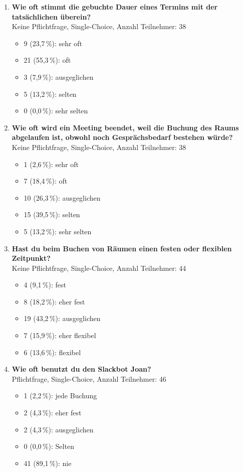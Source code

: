 \begin{enumerate}
    \item \textbf{Wie oft stimmt die gebuchte Dauer eines Termins mit der tatsächlichen überein?} 
    \\ 
    Keine Pflichtfrage, Single-Choice, Anzahl Teilnehmer: 38
    \begin{itemize}
        \item[] 9 (23,7\,\%): sehr oft
        \item[] 21 (55,3\,\%): oft
        \item[] 3 (7,9\,\%): ausgeglichen
        \item[] 5 (13,2\,\%): selten
        \item[] 0 (0,0\,\%): sehr selten
    \end{itemize}
    
    \item \textbf{Wie oft wird ein Meeting beendet, weil die Buchung des Raums abgelaufen ist, obwohl noch Gesprächsbedarf bestehen würde?} \\ 
    Keine Pflichtfrage, Single-Choice, Anzahl Teilnehmer: 38
    \begin{itemize}
        \item[] 1 (2,6\,\%): sehr oft
        \item[] 7 (18,4\,\%): oft
        \item[] 10 (26,3\,\%): ausgeglichen
        \item[] 15 (39,5\,\%): selten
        \item[] 5 (13,2\,\%): sehr selten
    \end{itemize}
    
    \item \textbf{Hast du beim Buchen von Räumen einen festen oder flexiblen Zeitpunkt?} \\ 
    Keine Pflichtfrage, Single-Choice, Anzahl Teilnehmer: 44
    \begin{itemize}
        \item[] 4 (9,1\,\%): fest
        \item[] 8 (18,2\,\%): eher fest
        \item[] 19 (43,2\,\%): ausgeglichen
        \item[] 7 (15,9\,\%): eher flexibel
        \item[] 6 (13,6\,\%): flexibel
    \end{itemize}
    
    \item \textbf{Wie oft benutzt du den Slackbot Joan?} \\ 
    Pflichtfrage, Single-Choice, Anzahl Teilnehmer: 46
    \begin{itemize}
        \item[] 1 (2,2\,\%): jede Buchung
        \item[] 2 (4,3\,\%): eher fest
        \item[] 2 (4,3\,\%): ausgeglichen
        \item[] 0 (0,0\,\%): Selten
        \item[] 41 (89,1\,\%): nie
    \end{itemize}
    

\end{enumerate}
